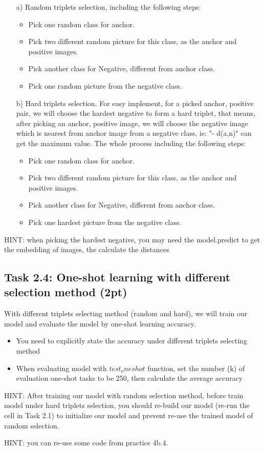 \documentclass[a4paper,twoside,10pt]{article}
\begin{document}
\begin{itemize} 
\item[a)] Random  triplets selection, including the following steps:

    \begin{itemize}
    \item Pick one random class for anchor.
    \item Pick two different random picture for this class, as the anchor and positive images.
    \item Pick another class for Negative, different from anchor class.
    \item Pick one random picture from the negative class.
    \end{itemize}


\item[b)] Hard triplets selection. For easy implement, for a picked anchor, positive pair, we will choose the hardest negative to form a hard triplet, that means, after picking an anchor, positive image, we will choose the negative image which is nearest from anchor image from a negative class, ie: "- d(a,n)"  can get the maximum value. The whole process including the following steps:

    \begin{itemize}
    \item Pick one random class for anchor.
    \item Pick two different random picture for this class, as the anchor and positive images.
    \item Pick another class for Negative, different from anchor class.
    \item Pick one hardest picture from the negative class.
    \end{itemize}


\end{itemize}
HINT: when picking the hardest negative, you may need the model.predict to get the embedding of images, the calculate the distances




\subsection*{Task 2.4: One-shot learning with different selection method (2pt)}

With different triplets selecting method (random and hard), we will train our model and evaluate the model by one-shot learning accuracy.
\begin{itemize}
    \item You need to explicitly state the accuracy under different  triplets selecting method
    \item  When evaluating model with $test_oneshot$ function, set the number (k) of evaluation one-shot tasks to be 250, then calculate the average accuracy
\end{itemize}
HINT: After training our model with random selection method, before train model under hard triplets selection, you should re-build our model (re-run the cell in Task 2.1) to initialize our model and prevent re-use the trained model of random selection.

HINT: you can re-use some code from practice 4b.4.
\end{document}
